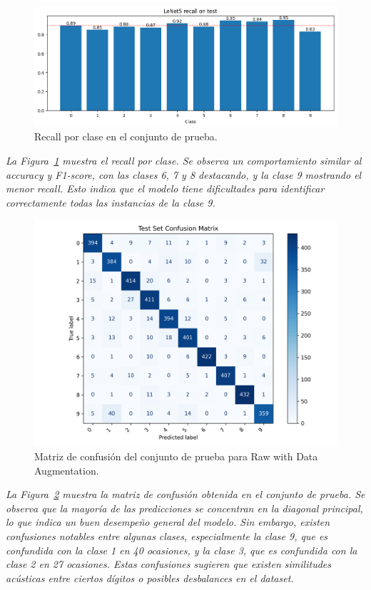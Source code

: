 \documentclass[conference]{IEEEtran}
\begin{document}
\begin{figure}[H]
    \centering
    \includegraphics[width=0.95\linewidth]{graphics-raw-da/raw-da-recall-test.png}
    \caption{Recall por clase en el conjunto de prueba.}
    \label{fig:raw-da-recall-test}
\end{figure}
\noindent\textit{
La Figura~\ref{fig:raw-da-recall-test} muestra el recall por clase. Se observa un comportamiento similar al accuracy y F1-score, con las clases 6, 7 y 8 destacando, y la clase 9 mostrando el menor recall. Esto indica que el modelo tiene dificultades para identificar correctamente todas las instancias de la clase 9.
}


\begin{figure}[H]
    \centering
    \includegraphics[width=0.95\linewidth]{graphics-raw-da/raw-da-confusion-matrix.png}
    \caption{Matriz de confusión del conjunto de prueba para Raw with Data Augmentation.}
    \label{fig:raw-da-confusion-matrix}
\end{figure}
\noindent\textit{
La Figura~\ref{fig:raw-da-confusion-matrix} muestra la matriz de confusión obtenida en el conjunto de prueba. Se observa que la mayoría de las predicciones se concentran en la diagonal principal, lo que indica un buen desempeño general del modelo. Sin embargo, existen confusiones notables entre algunas clases, especialmente la clase 9, que es confundida con la clase 1 en 40 ocasiones, y la clase 3, que es confundida con la clase 2 en 27 ocasiones. Estas confusiones sugieren que existen similitudes acústicas entre ciertos dígitos o posibles desbalances en el dataset.
}
\end{document}

